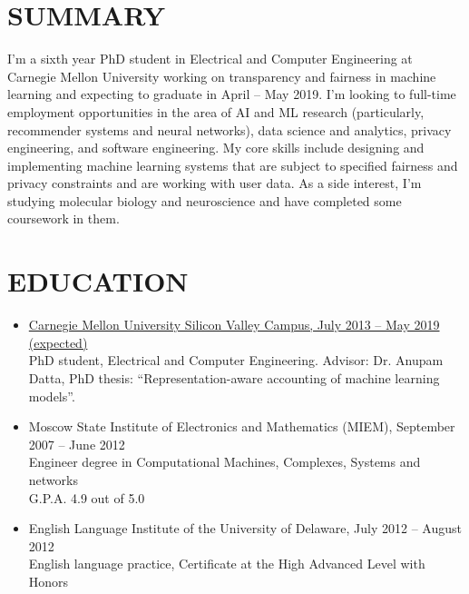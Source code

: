 \documentclass{res}
\begin{document}
 


\address{Phone: (302) 415-4176\\Email, Google Hangouts: \href{mailto:sophia.m.kovaleva@gmail.com}{sophia.m.kovaleva@gmail.com}}


\begin{resume}

\section{SUMMARY}

I'm a sixth year PhD student in Electrical and Computer Engineering at Carnegie Mellon University working on transparency and fairness in machine learning and expecting to graduate in April -- May 2019.
I'm looking to full-time employment opportunities in the area of AI and ML research (particularly, recommender systems and neural networks), data science and analytics, privacy engineering, and software engineering. 
My core skills include designing and implementing machine learning systems that are subject to specified fairness and privacy constraints and are working with user data. As a side interest, I'm studying molecular biology and neuroscience and have completed some coursework in them.


\section{EDUCATION}
\begin{itemize}
	\item
		\underline{Carnegie Mellon University Silicon Valley Campus, July 2013 -- May 2019 (expected)}\\
		PhD student, Electrical and Computer Engineering. Advisor: Dr. Anupam Datta, PhD thesis: ``Representation-aware accounting of machine learning models''.
	\item
		Moscow State Institute of Electronics and Mathematics (MIEM), September 2007 -- June 2012\\
		Engineer degree in Computational Machines, Complexes, Systems and networks\\
		G.P.A. 4.9 out of 5.0
	\item
		English Language Institute of the University of Delaware, July 2012 -- August 2012\\
		English language practice, Certificate at the High Advanced Level with Honors
\end{itemize}


\end{resume}
\end{document}
